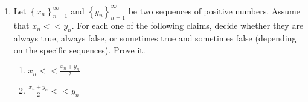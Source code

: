 \documentclass[12pt]{exam}
\newcommand {\DS} [1] {${\displaystyle #1}$}
\newcommand{\vv}{\vspace{.1cm}}
\begin{document}
\begin{enumerate}
\vv

\item Let \DS{\left\{x_n\right\}_{n=1}^{\infty}} and \DS{\left\{y_n\right\}_{n=1}^{\infty}} be two sequences of positive numbers.  Assume that \DS{x_n << y_n}. 
	For each one of the following claims, decide whether they are always true, always false, or sometimes true and sometimes false (depending on the specific sequences).  Prove it.
	\begin{enumerate}
		\item \DS{x_n << \frac{x_n+y_n}{2}}
		\item \DS{\frac{x_n+y_n}{2} << y_n}
	\end{enumerate}

\end{enumerate}
\end{document}
